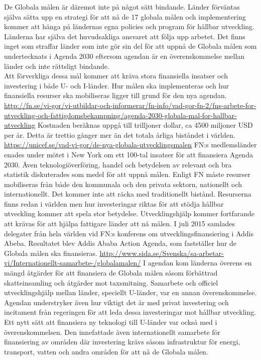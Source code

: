 \documentclass{report}
\begin{document}
De Globala målen är däremot inte på något sätt bindande. Länder förväntas själva sätta upp en strategi för att nå de 17 globala målen och implementering kommer att hänga på ländernas egna policies och program för hållbar utveckling. Länderna har själva det huvudsakliga ansvaret att följa upp arbetet. Det finns inget som straffar länder som inte gör sin del för att uppnå de Globala målen som undertecknats i Agenda 2030 eftersom agendan är en överenskommelse mellan länder och inte rättsligt bindande. \cite{web2030agenda}\\

Att förverkliga dessa mål kommer att kräva stora finansiella insatser och  investering i både U- och I-länder. \cite{web2030agenda}
Hur målen ska implementeras och hur finansiella resurser ska mobiliseras ligger till grund för den nya agendan. \url {http://fn.se/vi-gor/vi-utbildar-och-informerar/fn-info/vad-gor-fn-2/fns-arbete-for-utveckling-och-fattigdomsbekampning/agenda-2030-globala-mal-for-hallbar-utveckling} 
Kostnaden beräknas uppgå till trilljoner dollar, \cite{web2030agenda} ca 4500 miljoner USD per år. Detta är trettio gånger mer än det totala årliga biståndet i världen. \url {https://unicef.se/vad-vi-gor/de-nya-globala-utvecklingsmalen} FN:s medlemsländer enades under mötet i New York om ett 100-tal insatser för att finansiera Agenda 2030. Även teknologiöverföring, handel och betydelsen av relevant och bra statistik diskuterades som medel för att uppnå målen. \cite{webUNASweden}
Enligt FN måste resurser mobiliseras från både den kommunala och den privata sektorn, nationellt och internationellt. Det kommer inte att räcka med traditionellt bistånd. Resurserna finns redan i världen men hur investeringar riktas för att stödja hållbar utveckling kommer att spela stor betydelse. Utvecklingshjälp kommer fortfarande att krävas för att hjälpa fattigare länder att nå målen. 
\cite{web2030agenda}
I juli 2015 samlades delegater från hela världen vid FN:s konferens om utvecklingsfinansiering i Addis Abeba. Resultatet blev Addis Ababa Action Agenda, som fastställer hur de Globala målen ska finansieras. \url { http://www.sida.se/Svenska/sa-arbetar-vi/Internationellt-samarbete-/globalamalen/}
I agendan kom länderna överens en mängd åtgärder för att finansiera de Globala målen såsom förbättrad skatteinsamling och åtgärder mot taxsmitning. Samarbete och officiel utvecklingshjälp mellan länder, speciellt U-länder, var en annan överenskommelse. Agendan understryker även hur viktigt det är med privat investering och incitament från regeringen för att leda dessa investeringar mot hållbar utveckling. Ett nytt sätt att finansiera ny teknologi till U-länder var också med i överenskommelsen. Den innefattade även internationellt samarbete för finansiering av områden där investering krävs såsom infrastruktur för energi, transport, vatten och andra områden för att nå de Globala målen.  
\cite{webUNDESA}\\
\end{document}
